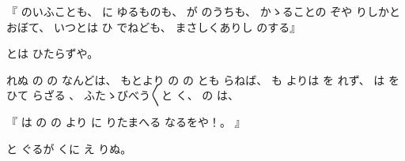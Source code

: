 %
『
のいふことも、
%
に
ゆるものも、
%
が
のうちも、
%
かゝることの
ぞや
りしかとおぼ{}て、
%
いつとは
ひ
でねども、
%
まさしくありし
のする』

%
とは
ひたらずや。

%
れぬ
の
の
なんどは、
%
もとより
の
の
とも
らねば、
%
も
よりは
を
れず、
%
は
を
ひて
らざる
、
%
ふたゝびべう〳〵と
く、
%
の
は、

%
『
は
の
の
より
に
りたまへる
なるをや！。
』

%
と
ぐるが
くに
え
りぬ。
